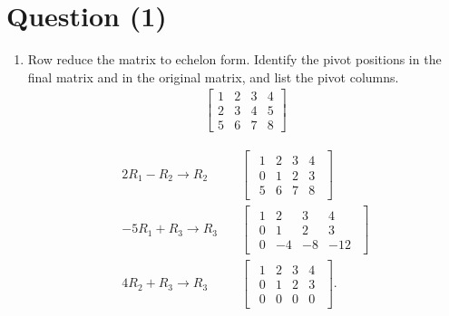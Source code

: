 \documentclass{zc-ust-hw}
\begin{document}
\maketitle


\section*{Question (1)}

\begin{enumerate}
  \item Row reduce the matrix to echelon form. Identify the pivot positions in the final matrix and in the original matrix, and list the pivot columns.
    \begin{align*}
      \begin{bmatrix} 
        1 & 2 & 3 & 4 \\
        2 & 3 & 4 & 5 \\
        5 & 6 & 7 & 8
      \end{bmatrix} 
    \end{align*}

    \begin{align}
      2R_1-R_2\rightarrow R_2
          & \quad
          \begin{bmatrix} 
            \begin{array}{ccc|c}
              1 & 2 & 3 & 4 \\
              0 & 1 & 2 & 3 \\
              5 & 6 & 7 & 8
            \end{array}
          \end{bmatrix} \\
          -5R_1+R_3\rightarrow R_3
          & \quad
          \begin{bmatrix} 
            \begin{array}{ccc|c}
              1 & 2 & 3 & 4 \\
              0 & 1 & 2 & 3 \\
              0 & -4 & -8 & -12
            \end{array}
          \end{bmatrix} \\
          4R_2+R_3\rightarrow R_3
          & \quad
          \begin{bmatrix} 
            \begin{array}{ccc|c}
              1 & 2 & 3 & 4 \\
              0 & 1 & 2 & 3 \\
              0 & 0 & 0 & 0
            \end{array}
          \end{bmatrix}
        .\end{align}


\end{enumerate}
\end{document}
